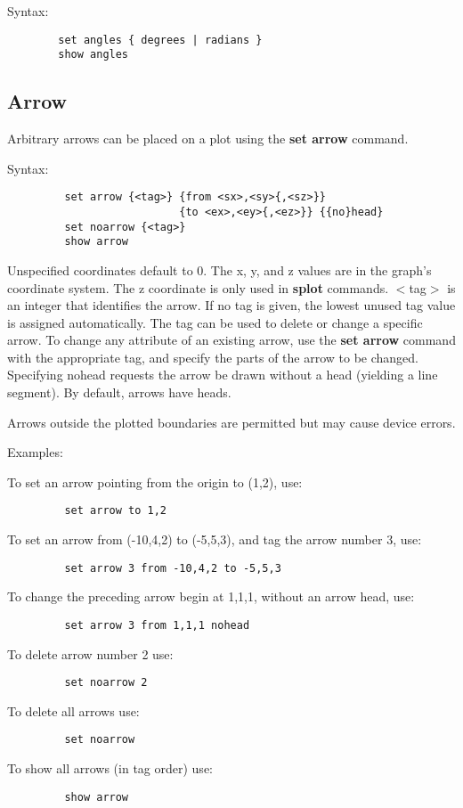 Syntax:
\begin{verbatim}
        set angles { degrees | radians }
        show angles
\end{verbatim}
\subsection{Arrow}
Arbitrary arrows can be placed on a plot using the {\bf set arrow}
command.

Syntax:

\begin{verbatim}
         set arrow {<tag>} {from <sx>,<sy>{,<sz>}} 
                           {to <ex>,<ey>{,<ez>}} {{no}head}
         set noarrow {<tag>}
         show arrow
\end{verbatim}


Unspecified coordinates default to 0. The x, y, and z values are in
the graph's coordinate system. The z coordinate is only used in
{\bf splot} commands. $<$tag$>$ is an integer that identifies the arrow. If no
tag is given, the lowest unused tag value is assigned automatically.
The tag can be used to delete or change a specific arrow. To change
any attribute of an existing arrow, use the {\bf set arrow} command with
the appropriate tag, and specify the parts of the arrow to be
changed. Specifying nohead requests the arrow be drawn without a head
(yielding a line segment). By default, arrows have heads.

Arrows outside the plotted boundaries are permitted but may cause
device errors.

Examples:

To set an arrow pointing from the origin to (1,2), use:
\begin{verbatim}
         set arrow to 1,2
\end{verbatim}
To set an arrow from (-10,4,2) to (-5,5,3), and tag the arrow number
3, use:
\begin{verbatim}
         set arrow 3 from -10,4,2 to -5,5,3
\end{verbatim}
To change the preceding arrow begin at 1,1,1, without an arrow head,
use:
\begin{verbatim}
         set arrow 3 from 1,1,1 nohead
\end{verbatim}
To delete arrow number 2 use:
\begin{verbatim}
         set noarrow 2
\end{verbatim}
To delete all arrows use:
\begin{verbatim}
         set noarrow
\end{verbatim}
To show all arrows (in tag order) use:
\begin{verbatim}
         show arrow
\end{verbatim}
